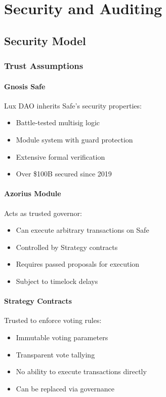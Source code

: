 \section{Security and Auditing}


\subsection{Security Model}

\subsubsection{Trust Assumptions}

\paragraph{Gnosis Safe} Lux DAO inherits Safe's security properties:
\begin{itemize}
    \item Battle-tested multisig logic
    \item Module system with guard protection
    \item Extensive formal verification
    \item Over \$100B secured since 2019
\end{itemize}

\paragraph{Azorius Module} Acts as trusted governor:
\begin{itemize}
    \item Can execute arbitrary transactions on Safe
    \item Controlled by Strategy contracts
    \item Requires passed proposals for execution
    \item Subject to timelock delays
\end{itemize}

\paragraph{Strategy Contracts} Trusted to enforce voting rules:
\begin{itemize}
    \item Immutable voting parameters
    \item Transparent vote tallying
    \item No ability to execute transactions directly
    \item Can be replaced via governance
\end{itemize}

